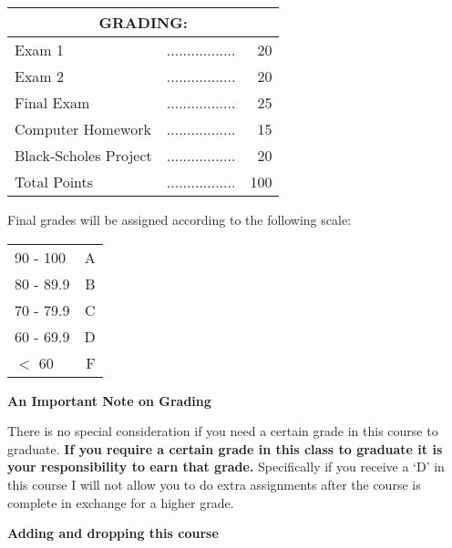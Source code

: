 \documentclass{article}
\begin{document}
\begin{center}
\begin{tabular}{lcr}
\multicolumn{3}{c}{\bf GRADING:} \\ \hline
Exam 1 & ................. & 20 \\

Exam 2 & ................. & 20 \\

Final Exam & ................. & 25\\


Computer Homework & ................. & 15 \\

Black-Scholes Project & ................. &  20 \\


Total Points & ................. & 100\\
\end{tabular}
\end{center}
\vspace*{5pt}
\begin{center}
{Final grades will be assigned according to the following scale}:
\end{center}
\begin{center}
\begin{tabular}{lr}
90 - 100 &  A \\
80 - 89.9 &  B \\
70 - 79.9 &  C \\
60 - 69.9 &  D \\
$<$ 60 &  F \\
\end{tabular}
\end{center}
\vspace*{5pt}
\begin{center}
{\bf An Important Note on Grading}
\end{center}
There is no special consideration if you need a certain grade in this course to graduate.  {\bf If you require a certain grade in this class to graduate it is your responsibility to earn that grade.} Specifically if you receive a `D' in this course I will not allow you to do extra assignments after the course is complete in exchange for a higher grade. 
\begin{center}
{\bf Adding and dropping this course}
\end{center}
\end{document}
